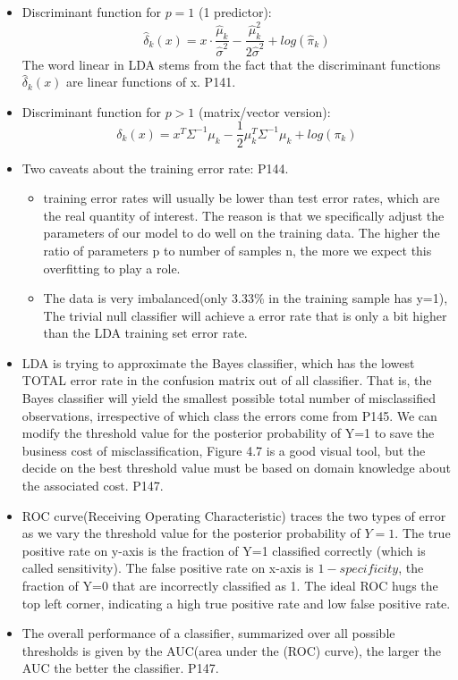 \documentclass[a4paper, 12pt]{article}
\begin{document}
\begin{itemize}
	\item Discriminant function for $p=1$ (1 predictor):
	\[\hat{\delta}_k(x)=x\cdot \frac{\hat{\mu}_k}{\hat{\sigma}^2}-\frac{\hat{\mu}_k^2}{2\hat{\sigma}^2} +log(\hat{\pi}_k)
	\]
	The word linear in LDA stems from the fact that the discriminant functions $\hat{\delta}_k(x)$ are linear functions of x. P141.
	\item Discriminant function for $p>1$ (matrix/vector version):
	\[\delta_k(x)=x^T\Sigma^{-1}\mu_k-\frac{1}{2}\mu_k^T\Sigma^{-1}\mu_k +log(\pi_k)
	\]
	\item Two caveats about the training error rate: P144.
		\begin{itemize}
			\item training error rates will usually be lower than test error rates, which are the real quantity of interest. The reason is that we specifically adjust the parameters of our model to do well on the training data. The higher the ratio of parameters p to number of samples n, the more we expect this overfitting to play a role.
			\item The data is very imbalanced(only 3.33\% in the training sample has y=1), The trivial null classifier will achieve a error rate that is only a bit higher than the LDA training set error rate.
		\end{itemize}
	\item LDA is trying to approximate the Bayes classifier, which has the lowest TOTAL error rate in the confusion matrix out of all classifier. That is, the Bayes classifier will yield the smallest possible total number of misclassified observations, irrespective of which class the errors come from P145. We can modify the threshold value for the posterior probability of Y=1 to save the business cost of misclassification, Figure 4.7 is a good visual tool, but the decide on the best threshold value must be based on domain knowledge about the associated cost. P147.
	\item ROC curve(Receiving Operating Characteristic) traces the two types of error as we vary the threshold value for the posterior probability of $Y=1$. The true positive rate on y-axis is the fraction of Y=1 classified correctly (which is called sensitivity). The false positive rate on x-axis is $1-specificity$, the fraction of Y=0 that are incorrectly classified as 1. The ideal ROC hugs the top left corner, indicating a high true positive rate and low false positive rate.
	\item The overall performance of a classifier, summarized over all possible thresholds is given by the AUC(area under the (ROC) curve), the larger the AUC the better the classifier. P147.

\end{itemize}
\end{document}
